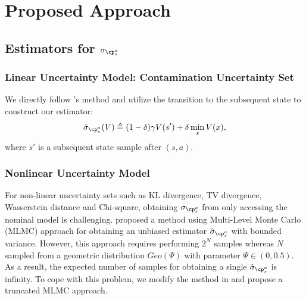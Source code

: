 \section{Proposed Approach}

\subsection{Estimators for $\sigma_{\cp^a_s}$}
\subsubsection{Linear Uncertainty Model: Contamination Uncertainty Set}
We directly follow \citep{wang2023model}'s method and utilize the transition to the subsequent state to construct our estimator:
\begin{align}\label{eq:12}
    \hat{\sigma}_{\cp^a_s}(V)\triangleq (1-\delta)\gamma V(s')+\delta\min_x V(x),
\end{align}
where $s'$ is a subsequent state sample after $(s,a)$. 
\subsubsection{Nonlinear Uncertainty Model}
For non-linear uncertainty sets such as KL divergence, TV divergence, Wasserstein distance and Chi-square, obtaining $\sigma_{\cp^a_s}$ from only accessing the nominal model is challenging. \citep{wang2023model} proposed a method using Multi-Level Monte Carlo (MLMC) approach for obtaining an unbiased estimator $\hat{\sigma}_{\cp^a_s}$ with bounded variance. However,  this approach requires performing $2^N$ samples whereas $N$ sampled from a geometric distribution $Geo(\Psi)$ with parameter $\Psi \in (0,0.5)$. As a result, the expected number of samples for obtaining a single $\hat{\sigma}_{\cp^a_s}$ is infinity. To cope with this problem, we modify the method in \citep{wang2023model} and propose a truncated MLMC approach.

